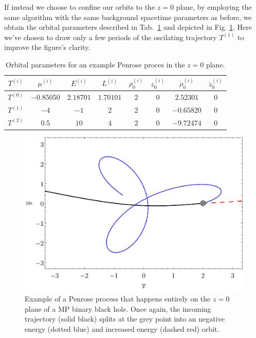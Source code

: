 If instead we choose to confine our orbits to the $z=0$ plane, by employing the same algorithm with the same background spacetime parameters as before, we obtain the orbital parameters described in Tab.~\ref{ch:penrose_binaries/tab:exemple_orbital_parameters_2} and depicted in Fig. \ref{ch:penrose_binaries/fig:penrose_example_2}. Here we've chosen to draw only a few periods of the oscilating trajectory $T^{(1)}$ to improve the figure's clarity.

\begin{table}[!htbp]
    \centering
    \caption{Orbital parameters for an example Penrose proces in the $z=0$ plane.}
    \begin{tabular}{c|c|c|c|c|c|c|c|}
        \cline{1-8}
        \multicolumn{1}{|c|}{$T^{(i)}$} & $\mu^{(i)}$ & $E^{(i)}$ & $L^{(i)}$ & $\rho_0^{(i)}$ & $z_0^{(i)}$ & $\dot{\rho}_0^{(i)}$ & $\dot{z}_0^{(i)}$ \\ \hline
        \multicolumn{1}{|c|}{$T^{(0)}$} & $-0.85050$  & $2.18701$ & $1.70101$ & $2$            & $0$         & $2.52301$            & $0$               \\ \hline
        \multicolumn{1}{|c|}{$T^{(1)}$} & $-4$        & $-1$      & $2$       & $2$            & $0$         & $-0.65820$           & $0$               \\ \hline
        \multicolumn{1}{|c|}{$T^{(2)}$} & $0.5$       & $10$      & $4$       & $2$            & $0$         & $-9.72474$           & $0$               \\ \hline
    \end{tabular}
    \label{ch:penrose_binaries/tab:exemple_orbital_parameters_2}
\end{table}

\begin{figure}[!htbp]
    \centering
    \includegraphics[scale = 0.43]{img/penrose_binaries/mp/penrose_xy.pdf}
    \caption{Example of a Penrose process that happens entirely on the $z=0$ plane of a MP binary black hole. Once again, the incoming trajectory (solid black) splits at the grey point into an negative energy (dotted blue) and increased energy (dashed red) orbit.}
    \label{ch:penrose_binaries/fig:penrose_example_2}
\end{figure}

